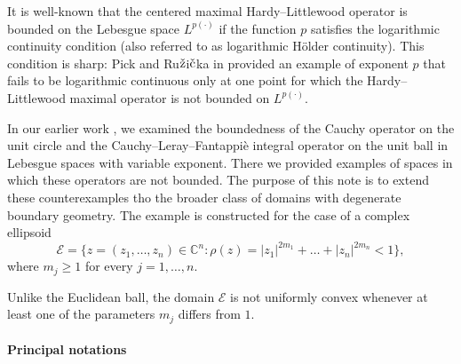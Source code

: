 \documentclass[review]{elsarticle}
\newcommand{\abs}[1]{\left\vert #1 \right\vert}
\newcommand{\C}{\mathbb{C}}
\begin{document}
It is well-known that the centered maximal Hardy--Littlewood operator is bounded on the
Lebesgue space $L^{p(\cdot)}$ if the function $p$ satisfies the logarithmic
continuity condition (also referred to as logarithmic H\"{o}lder continuity). This condition is sharp:  Pick and
Ru$\rm{\check{z}}$i$\rm{\check{c}}$ka in \cite{PR01} provided an example
of exponent $p$ that fails to be logarithmic continuous only at
one point for which the Hardy--Littlewood maximal operator is not
bounded on $L^{p(\cdot)}.$ 

In our earlier work \cite{R17}, we examined the
boundedness of the Cauchy operator on the unit circle and the Cauchy--Leray--Fantappi\`{e} integral operator on the unit ball in Lebesgue spaces with variable exponent. There we provided examples of spaces in which these operators are not bounded. The purpose of this note is to extend these counterexamples tho the broader class of domains with degenerate boundary geometry. The example is constructed for the case of a complex ellipsoid
\begin{equation}
	\mathcal{E} = \{ z = (z_1,\ldots,z_n)\in\C^n : \rho(z)= \abs{z_1}^{2m_1}+\ldots+ \abs{z_n}^{2m_n}<1\},
\end{equation}
where $m_j\geq1$ for every $j=1,\ldots,n.$

Unlike the Euclidean ball, the domain $\mathcal{E}$ is not uniformly convex whenever at least one of the parameters $m_j$ differs from $1.$

\paragraph{Principal notations}
\end{document}
